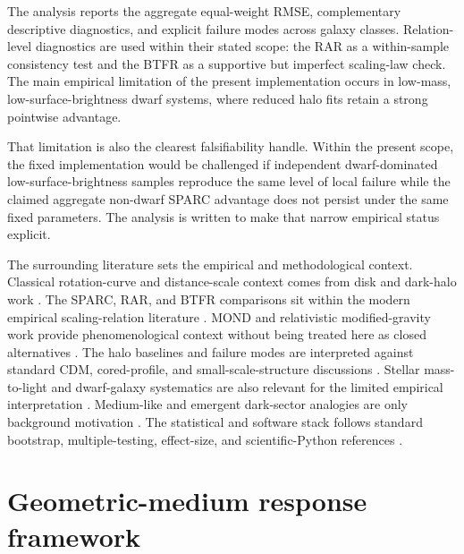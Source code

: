 ﻿\documentclass[twocolumn]{aastex701}
\begin{document}
The analysis reports the aggregate equal-weight RMSE, complementary descriptive diagnostics, and explicit failure modes across galaxy classes. Relation-level diagnostics are used within their stated scope: the RAR as a within-sample consistency test and the BTFR as a supportive but imperfect scaling-law check. The main empirical limitation of the present implementation occurs in low-mass, low-surface-brightness dwarf systems, where reduced halo fits retain a strong pointwise advantage.

That limitation is also the clearest falsifiability handle. Within the present scope, the fixed implementation would be challenged if independent dwarf-dominated low-surface-brightness samples reproduce the same level of local failure while the claimed aggregate non-dwarf SPARC advantage does not persist under the same fixed parameters. The analysis is written to make that narrow empirical status explicit.

The surrounding literature sets the empirical and methodological context. Classical rotation-curve and distance-scale context comes from disk and dark-halo work \citep{freeman1970,tully1977,rubin1978,rubin1980,bosma1981,begeman1991,sofue2001}. The SPARC, RAR, and BTFR comparisons sit within the modern empirical scaling-relation literature \citep{lelli2016,mcgaugh2016,lelli2019,mcgaugh2000,mcgaugh2005,mcgaugh2012,stark2009}. MOND and relativistic modified-gravity work provide phenomenological context without being treated here as closed alternatives \citep{milgrom1983,sanders2002,famaey2012,bekenstein2004,skordis2021,milgrom2014}. The halo baselines and failure modes are interpreted against standard CDM, cored-profile, and small-scale-structure discussions \citep{navarro1997,burkert1995,deblok2001,deblok2008,moore1999,boylankolchin2011,bullock2017,pontzen2012,governato2012,dicintio2014,oman2015,sales2017,maccio2008,dutton2014,planck2020}. Stellar mass-to-light and dwarf-galaxy systematics are also relevant for the limited empirical interpretation \citep{chabrier2003,bell2003,meidt2014,oh2015}. Medium-like and emergent dark-sector analogies are only background motivation \citep{berezhiani2015,verlinde2017}. The statistical and software stack follows standard bootstrap, multiple-testing, effect-size, and scientific-Python references \citep{efron1979,efron1987,wilson1927,cohen1988,holm1979,hunter2007,harris2020,virtanen2020,reback2020}.

\section{Geometric-medium response framework}
\end{document}
